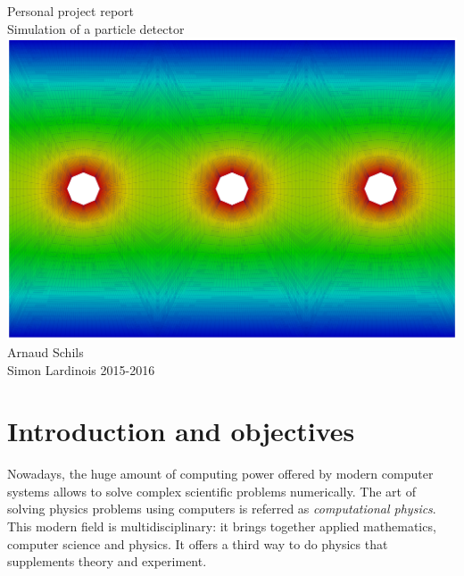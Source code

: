 \documentclass[11pt]{article}
\date{2015-2016}
\begin{document}

	\begin{titlepage}
    \centering
    \vfill
    { \Huge{Personal project report \\ Simulation of a particle detector}
		  \vfill
			\vfill
			\vfill
      \includegraphics[scale=0.055]{images/grid_refinement/garde.png}
			\vfill
			\vfill
			\Large{Arnaud Schils\\ Simon Lardinois}
			\vfill
			\Large{2015-2016}
    }

\end{titlepage}


\newpage


\renewcommand\cftsecleader{\cftdotfill{\cftdotsep}}
\renewcommand{\contentsname}{Table of contents}
\tableofcontents


\newpage
\section*{Introduction and objectives}

	Nowadays, the huge amount of computing power offered by modern computer systems allows
	to solve complex scientific problems numerically. The art of solving physics problems using
	computers is referred as \textit{computational physics}. This modern field
	is multidisciplinary: it brings together applied mathematics,
	computer science and physics. It offers a third way to do physics
	that supplements theory and experiment.
\end{document}
